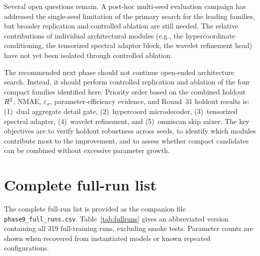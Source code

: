 ﻿\documentclass[preprint,12pt,authoryear]{elsarticle}
\newcommand{\rTwo}{R\textsuperscript{2}}
\begin{document}
Several open questions remain.
A post-hoc multi-seed evaluation campaign has addressed the single-seed limitation of the primary search for the leading families, but broader replication and controlled ablation are still needed.
The relative contributions of individual architectural modules (e.g., the hypercoordinate conditioning, the tensorized spectral adapter block, the wavelet refinement head) have not yet been isolated through controlled ablation.

The recommended next phase should not continue open-ended architecture search.
Instead, it should perform controlled replication and ablation of the four compact families identified here.
Priority order based on the combined holdout $\rTwo{}$, NMAE, $\varepsilon_{\sigma}$, parameter-efficiency evidence, and Round~31 holdout results is: (1)~dual aggregate detail gate, (2)~hypercoord microdecoder, (3)~tensorized spectral adapter, (4)~wavelet refinement, and (5)~omniscan skip mixer.
The key objectives are to verify holdout robustness across seeds, to identify which modules contribute most to the improvement, and to assess whether compact candidates can be combined without excessive parameter growth.

\appendix
\section{Complete full-run list}
\label{app:fullruns}

The complete full-run list is provided as the companion file \texttt{phase9\_full\_runs.csv}.
Table~\ref{tab:fullruns} gives an abbreviated version containing all 319 full-training runs, excluding smoke tests.
Parameter counts are shown when recovered from instantiated models or known repeated configurations.
\end{document}
